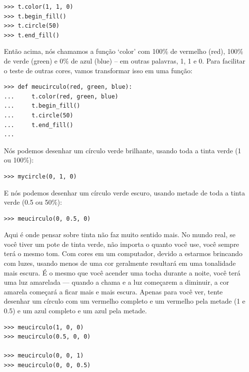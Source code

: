 \begin{listing}
\begin{verbatim}
>>> t.color(1, 1, 0)
>>> t.begin_fill()
>>> t.circle(50)
>>> t.end_fill()
\end{verbatim}
\end{listing}

Então acima, nós chamamos a função `color' com 100\% de vermelho (red), 100\% de verde (green) e 0\% de azul (blue) -- em outras palavras, 1, 1 e 0. Para facilitar o teste de outras cores, vamos transformar isso em uma função:

\begin{listing}
\begin{verbatim}
>>> def meucirculo(red, green, blue):
...     t.color(red, green, blue)
...     t.begin_fill()
...     t.circle(50)
...     t.end_fill()
...
\end{verbatim}
\end{listing}

\noindent
Nós podemos desenhar um círculo verde brilhante, usando toda a tinta verde (1 ou 100\%):

\begin{listing}
\begin{verbatim}
>>> mycircle(0, 1, 0)
\end{verbatim}
\end{listing}

\noindent
E nós podemos desenhar um círculo verde escuro, usando metade de toda a tinta verde (0.5 ou 50\%):

\begin{listing}
\begin{verbatim}
>>> meucirculo(0, 0.5, 0)
\end{verbatim}
\end{listing}

Aqui é onde pensar sobre tinta não faz muito sentido mais. No mundo real, se você tiver um pote de tinta verde, não importa o quanto você use, você sempre terá o mesmo tom. Com cores em um computador, devido a estarmos brincando com luzes, usando menos de uma cor geralmente resultará em uma tonalidade mais escura. É o mesmo que você acender uma tocha durante a noite, você terá uma luz amarelada --- quando a chama e a luz começarem a diminuir, a cor amarela começará a ficar mais e mais escura. Apenas para você ver, tente desenhar um círculo com um vermelho completo e um vermelho pela metade (1 e 0.5) e um azul completo e um azul pela metade.

\begin{listing}
\begin{verbatim}
>>> meucirculo(1, 0, 0)
>>> meucirculo(0.5, 0, 0)

>>> meucirculo(0, 0, 1)
>>> meucirculo(0, 0, 0.5)
\end{verbatim}
\end{listing}

